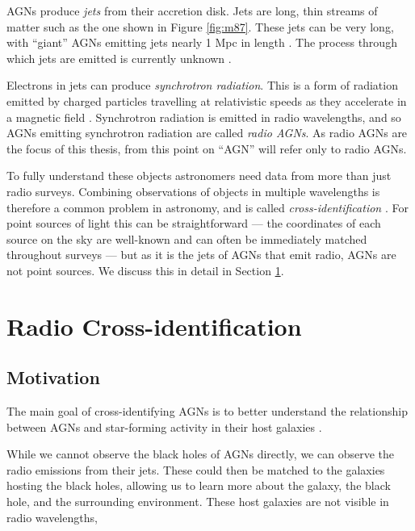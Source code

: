         AGNs produce \emph{jets} from their accretion disk. Jets are long, thin
        streams of matter such as the one shown in Figure \ref{fig:m87}. These
        jets can be very long, with ``giant'' AGNs emitting jets nearly 1 Mpc in
        length \citep{saripalli05}. The process through which jets are emitted
        is currently unknown \citeme.

        Electrons in jets can produce \emph{synchrotron radiation}. This is a
        form of radiation emitted by charged particles travelling at
        relativistic speeds as they accelerate in a magnetic field \citeme.
        Synchrotron radiation is emitted in radio wavelengths, and so AGNs
        emitting synchrotron radiation are called \emph{radio AGNs}. As radio
        AGNs are the focus of this thesis, from this point on ``AGN'' will refer
        only to radio AGNs.

        To fully understand these objects astronomers need data from more than
        just radio surveys. Combining observations of objects in multiple
        wavelengths is therefore a common problem in astronomy, and is called
        \emph{cross-identification} \citep{fan15}. For point sources of light
        this can be straightforward --- the coordinates of each source on the
        sky are well-known and can often be immediately matched throughout
        surveys --- but as it is the jets of AGNs that emit radio, AGNs are not
        point sources. We discuss this in detail in Section
        \ref{sec:radio-cross-identification}.

    \section{Radio Cross-identification}
    \label{sec:radio-cross-identification}

        \subsection{Motivation}
        \label{sec:cross-identification-motivation}

        The main goal of cross-identifying AGNs is to better understand the
        relationship between AGNs and star-forming activity in their host
        galaxies \citep{norris06}.

        While we cannot observe the black holes of AGNs directly, we can observe
        the radio emissions from their jets. These could then be matched to the
        galaxies hosting the black holes, allowing us to learn more about the
        galaxy, the black hole, and the surrounding environment. These host
        galaxies are not visible in radio wavelengths,

